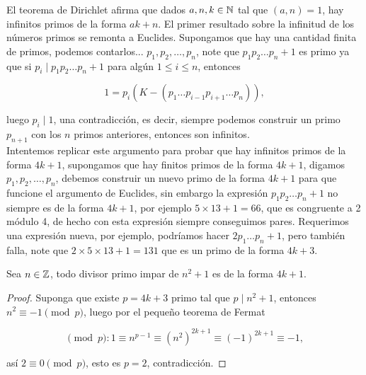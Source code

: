 
\thispagestyle{empty}
\vspace{-0.7cm}


El teorema de Dirichlet afirma que dados $a,n,k \in \mathbb{N}$ tal que $(a,n)=1$, hay infinitos primos de la forma $ak+n$. El primer resultado sobre la infinitud de los números primos se remonta a Euclides. Supongamos que hay una cantidad  finita de primos, podemos contarlos... $p_1,p_2,\ldots,p_n$, note que $p_1p_2\ldots p_n+1$ es primo ya que si $p_i\mid p_1p_2\ldots p_n+ 1$ para algún $1\leq i\leq n$, entonces

$$1=p_i(K-(p_1\ldots p_{i-1}p_{i+1}\ldots p_n)),$$

luego $p_i\mid 1$, una contradicción, es decir, siempre podemos construir un primo $p_{n+1}$ con los $n$ primos anteriores, entonces son infinitos.\\

Intentemos replicar este argumento para probar que hay infinitos primos de la forma $4k+1$, supongamos que hay finitos primos de la forma $4k+1$, digamos $p_1,p_2,\ldots,p_n$, debemos construir un nuevo primo de  la forma $4k+1$ para que funcione el argumento de Euclides, sin embargo la expresión  $p_1p_2\ldots p_n+1$ no siempre es de la forma $4k+1$, por ejemplo $5\times13+1=66$, que es congruente a 2 módulo 4, de hecho con esta expresión siempre conseguimos pares. Requerimos una expresión nueva, por ejemplo, podríamos hacer $2p_1\ldots p_n+1$, pero también falla, note que $2\times5\times13+1=131$ que es un primo de la forma $4k+3$.\\

\begin{prop}

Sea $n\in \mathbb{Z}$, todo divisor primo impar de $n^2+1$ es de la forma $4k+1$. 
\end{prop}

\begin{proof}
Suponga que existe $p=4k+3$ primo tal que $p\mid n^2+1$, entonces $n^2\equiv -1 \pmod{p}$, luego por el pequeño teorema de Fermat

$$\pmod{p}: 1\equiv n^{ p-1}\equiv (n^{2})^{2k+1}\equiv (-1)^{2k+1}\equiv -1,$$

así $2\equiv 0 \pmod{p}$, esto es $p=2$, contradicción.

\end{proof}

